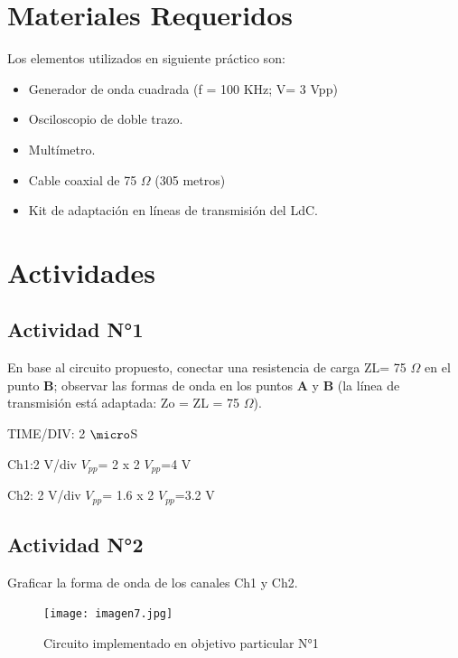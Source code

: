 \documentclass[12pt]{article}
\begin{document}
\section{Materiales Requeridos}
Los elementos utilizados en siguiente práctico son:
\begin{itemize}


 \item Generador de onda cuadrada (f = 100 KHz; V= 3 Vpp)
 \item Osciloscopio de doble trazo.
 \item Multímetro.
 \item Cable coaxial de 75 $\Omega$  (305 metros)
 \item Kit de adaptación en líneas de transmisión del LdC.
\end{itemize}


\section{Actividades}

\subsection{Actividad N°1}
 En base al circuito propuesto, conectar una resistencia de carga ZL= 75 $\Omega$ en el punto \textbf{B}; observar las formas de onda en los puntos \textbf{A} y \textbf{B} (la línea de transmisión está adaptada: Zo = ZL = 75 $\Omega$). 

 \begin{center}

  TIME/DIV: 2 $\micro$S

  Ch1:2 V/div \hspace{0.5cm} $V_{pp}$= 2 x 2  \hspace{0.5cm}   $V_{pp}$=4 V
  
  Ch2: 2 V/div \hspace{0.5cm} $V_{pp}$= 1.6 x 2 \hspace{0.5cm}   $V_{pp}$=3.2 V
\end{center}
                                                  
 
\subsection{Actividad N°2}
Graficar la forma de onda de los canales Ch1 y Ch2.

\begin{figure}[hbt]
\centering
\texttt{[image: imagen7.jpg]}\\
\caption{Circuito implementado en objetivo particular N°1}
\label{Figura 1}
\end{figure}
\end{document}

